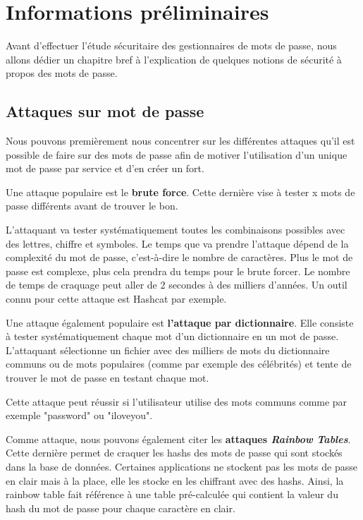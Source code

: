 
\chapter{Informations préliminaires}
\label{ch:informations}

Avant d'effectuer l'étude sécuritaire des gestionnaires de mots de passe, nous allons dédier un chapitre bref à l'explication de quelques notions de sécurité à propos des mots de passe. 

\section{Attaques sur mot de passe}

Nous pouvons premièrement nous concentrer sur les différentes attaques qu'il est possible de faire sur des mots de passe afin de motiver l'utilisation d'un unique mot de passe par service et d'en créer un fort. 

Une attaque populaire est le \textbf{brute force}. Cette dernière vise à tester x mots de passe différents avant de trouver le bon. 

L'attaquant va tester systématiquement toutes les combinaisons possibles avec des lettres, chiffre et symboles. Le temps que va prendre l'attaque dépend de la complexité du mot de passe, c'est-à-dire le nombre de caractères. Plus le mot de passe est complexe, plus cela prendra du temps pour le brute forcer. Le nombre de temps de craquage peut aller de 2 secondes à des milliers d'années. Un outil connu pour cette attaque est Hashcat par exemple.

Une attaque également populaire est \textbf{l'attaque par dictionnaire}. Elle consiste à tester systématiquement chaque mot d'un dictionnaire en un mot de passe. L'attaquant sélectionne un fichier avec des milliers de mots du dictionnaire communs ou de mots populaires (comme par exemple des célébrités) et tente de trouver le mot de passe en testant chaque mot. 

Cette attaque peut réussir si l'utilisateur utilise des mots communs comme par exemple "password" ou "iloveyou". 

Comme attaque, nous pouvons également citer les \textbf{attaques \textit{Rainbow Tables}}. Cette dernière permet de craquer les hashs des mots de passe qui sont stockés dans la base de données. Certaines applications ne stockent pas les mots de passe en clair mais à la place, elle les stocke en les chiffrant avec des hashs. Ainsi, la rainbow table fait référence à une table pré-calculée qui contient la valeur du hash du mot de passe pour chaque caractère en clair.

